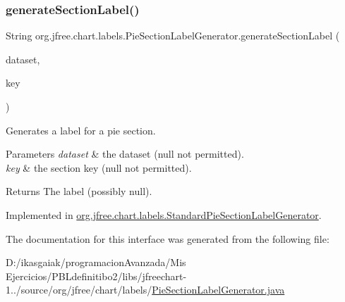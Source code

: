 \subsubsection{\texorpdfstring{generate\+Section\+Label()}{generateSectionLabel()}}
{\footnotesize\ttfamily String org.\+jfree.\+chart.\+labels.\+Pie\+Section\+Label\+Generator.\+generate\+Section\+Label (\begin{DoxyParamCaption}\item[{\mbox{\hyperlink{interfaceorg_1_1jfree_1_1data_1_1general_1_1_pie_dataset}{Pie\+Dataset}}}]{dataset,  }\item[{Comparable}]{key }\end{DoxyParamCaption})}

Generates a label for a pie section.


\begin{DoxyParams}{Parameters}
{\em dataset} & the dataset ({\ttfamily null} not permitted). \\
\hline
{\em key} & the section key ({\ttfamily null} not permitted).\\
\hline
\end{DoxyParams}
\begin{DoxyReturn}{Returns}
The label (possibly {\ttfamily null}). 
\end{DoxyReturn}


Implemented in \mbox{\hyperlink{classorg_1_1jfree_1_1chart_1_1labels_1_1_standard_pie_section_label_generator_a043e8cf227d2d5f5a457219ec6769488}{org.\+jfree.\+chart.\+labels.\+Standard\+Pie\+Section\+Label\+Generator}}.



The documentation for this interface was generated from the following file\+:\begin{DoxyCompactItemize}
\item 
D\+:/ikasgaiak/programacion\+Avanzada/\+Mis Ejercicios/\+P\+B\+Ldefinitibo2/libs/jfreechart-\/1../source/org/jfree/chart/labels/\mbox{\hyperlink{_pie_section_label_generator_8java}{Pie\+Section\+Label\+Generator.\+java}}\end{DoxyCompactItemize}
